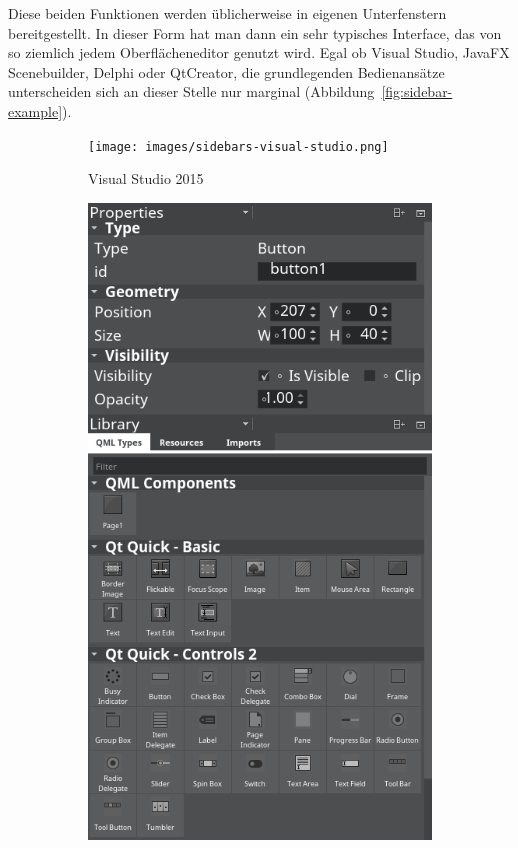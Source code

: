 Diese beiden Funktionen werden üblicherweise in eigenen Unterfenstern bereitgestellt. In dieser Form hat man dann ein sehr typisches Interface, das von so ziemlich jedem Oberflächeneditor genutzt wird. Egal ob Visual Studio, JavaFX Scenebuilder, Delphi oder QtCreator, die grundlegenden Bedienansätze unterscheiden sich an dieser Stelle nur marginal (Abbildung~\ref{fig:sidebar-example}).

\begin{figure}[h]
  \begin{subfigure}[b]{0.45\textwidth}
      \texttt{[image: images/sidebars-visual-studio.png]}
      \caption{Visual Studio 2015}
      \label{fig:sidebar-example-visual-studio}
  \end{subfigure}\hfill
  \begin{subfigure}[b]{0.45\textwidth}
    \includegraphics[width=\textwidth]{images/sidebars-qt-creator.png}

\end{subfigure}
\end{figure}
